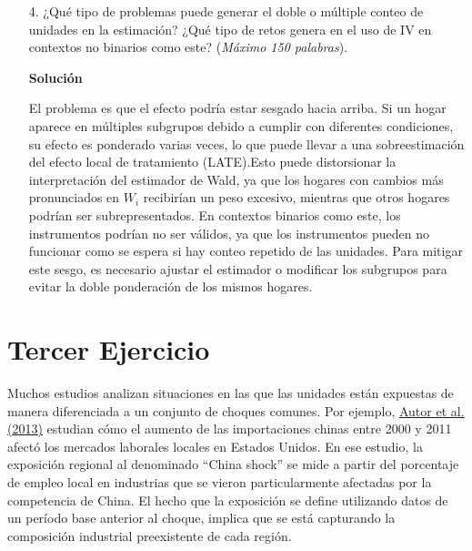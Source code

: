 \documentclass[a4paper, answers, addpoints, 11pt]{exam}
\newenvironment{solucion}{%
  \begin{mdframed}[
    backgroundcolor=blue!5,    %
    linecolor=blue!50,          %
    linewidth=2pt,              %
    leftmargin=10pt,            %
    rightmargin=8pt,           %
    topline=true,              %
    bottomline=true,            %
    roundcorner=10pt,           %
    innerleftmargin=10pt,       %
    innerrightmargin=10pt,      %
    innerbottommargin=10pt,     %
    innertopmargin=10pt         %
  ]%
  \begin{tcolorbox}[colframe=blue!50!black, colback=blue!50, coltitle=white, sharp corners=all, boxrule=1mm, width=\textwidth, halign=left, valign=center, top=0mm, bottom=0mm, left=0mm, right=0mm] \textbf{Solución} \end{tcolorbox} }{\end{mdframed}}
\begin{document}
    
    \begin{enumerate}
        \item[4.] ¿Qué tipo de problemas puede generar el doble o múltiple conteo de unidades en la estimación? ¿Qué tipo de retos genera en el uso de IV en contextos no binarios como este? (\textit{Máximo 150 palabras}).

        
        
        
\begin{solucion}
El problema es que el efecto podría estar sesgado hacia arriba. Si un hogar aparece en múltiples subgrupos debido a cumplir con diferentes condiciones, su efecto es ponderado varias veces, lo que puede llevar a una sobreestimación del efecto local de tratamiento (LATE).Esto puede distorsionar la interpretación del estimador de Wald, ya que los hogares con cambios más pronunciados en \( W_i \) recibirían un peso excesivo, mientras que otros hogares podrían ser subrepresentados. En contextos binarios como este, los instrumentos podrían no ser válidos, ya que los instrumentos pueden no funcionar como se espera si hay conteo repetido de las unidades. Para mitigar este sesgo, es necesario ajustar el estimador o modificar los subgrupos para evitar la doble ponderación de los mismos hogares.

\end{solucion}
        
    \end{enumerate}

    \newpage

\section*{Tercer Ejercicio}


Muchos estudios analizan situaciones en las que las unidades están expuestas de manera diferenciada a un conjunto de choques comunes. Por ejemplo, \href{https://www.aeaweb.org/articles?id=10.1257/aer.103.6.2121}{Autor et al. (2013)} estudian cómo el aumento de las importaciones chinas entre 2000 y 2011 afectó los mercados laborales locales en Estados Unidos. En ese estudio, la exposición regional al denominado “China shock” se mide a partir del porcentaje de empleo local en industrias que se vieron particularmente afectadas por la competencia de China. El hecho que la exposición se define utilizando datos de un período base anterior al choque, implica que se está capturando la composición industrial preexistente de cada región. \\
\end{document}
